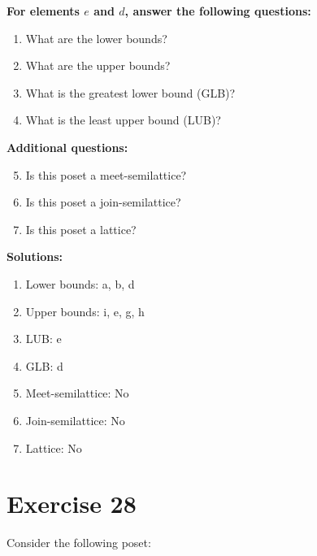 \documentclass{article}
\begin{document}
    \textbf{For elements $e$ and $d$, answer the following questions:}
\begin{enumerate}
    \item What are the lower bounds?
    \item What are the upper bounds?
    \item What is the greatest lower bound (GLB)?
    \item What is the least upper bound (LUB)?
\end{enumerate}
    \hspace*{3ex} \textbf{Additional questions:}
\begin{enumerate}
    \setcounter{enumi}{4}
    \item Is this poset a meet-semilattice?
    \item Is this poset a join-semilattice?
    \item Is this poset a lattice?
\end{enumerate}

\textbf{Solutions:}
\begin{enumerate}
    \item Lower bounds: {a, b, d}
    \item Upper bounds: {i, e, g, h}
    \item LUB: e
    \item GLB: d
    \item Meet-semilattice: No
    \item Join-semilattice: No
    \item Lattice: No
\end{enumerate}
\newpage
\section*{Exercise 28}
Consider the following poset:
\begin{center}
\end{center}
\end{document}
